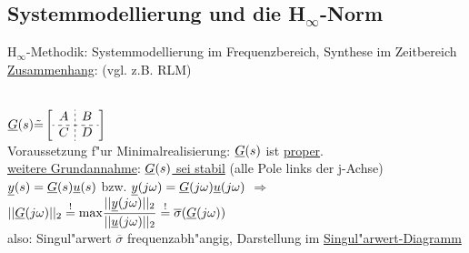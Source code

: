 \documentclass[openany,a4paper,11pt]{book}
\begin{document}
\subsection{Systemmodellierung und die H${}_\infty$-Norm}
H${}_\infty$-Methodik: Systemmodellierung im Frequenzbereich, Synthese im Zeitbereich\\
\uline{Zusammenhang}: (vgl. z.B. RLM)\\
\\
$\uline{G}(s)\tilde{=}\left[\begin{array}{c;{2pt/2pt}c} A & B \\ \hdashline[3pt/3pt] C & D  \end{array}\right]$\\
Voraussetzung f"ur Minimalrealisierung: $\uline{G}(s)$ ist \uline{proper}. \quad {}\\
\uline{weitere Grundannahme}: \uline{$\uline{G}(s)$ sei stabil} (alle Pole links der j-Achse)\\
$\uline{y}(s)=\uline{G}(s)\uline{u}(s)$ bzw. $\uline{y}(j\omega)=\uline{G}(j\omega)\uline{u}(j\omega)$ $\Rightarrow$ $\displaystyle||\uline{G}(j\omega)||_2\stackrel{!}{=}\text{max}\frac{||\uline{y}(j\omega)||_2}{||\uline{u}(j\omega)||_2}\stackrel{!}{=}\overline{\sigma}(\uline{G}(j\omega))$\\
also: Singul"arwert $\overline{\sigma}$ frequenzabh"angig, Darstellung im \uline{Singul"arwert-Diagramm}\\
\end{document}
